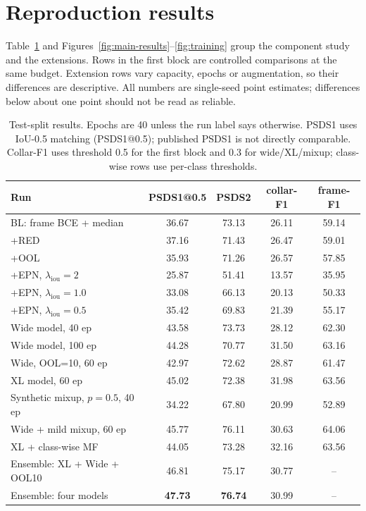 \section{Reproduction results}

Table~\ref{tab:results} and Figures~\ref{fig:main-results}--\ref{fig:training}
group the component study and the extensions. Rows in
the first block are controlled comparisons at the same budget. Extension rows
vary capacity, epochs or augmentation, so their differences are descriptive.
All numbers are single-seed point estimates; differences below about one point
should not be read as reliable.

\begin{table}[!ht]
\centering
\caption{Test-split results. Epochs are 40 unless the run label says otherwise. PSDS1 uses IoU-0.5 matching (PSDS1@0.5); published PSDS1 is not directly comparable. Collar-F1 uses threshold 0.5 for the first block and 0.3 for wide/XL/mixup; class-wise rows use per-class thresholds.}
\label{tab:results}
\begin{tabular}{lcccc}
\toprule
Run & PSDS1@0.5 & PSDS2 & collar-F1 & frame-F1 \\
\midrule
BL: frame BCE + median & 36.67 & 73.13 & 26.11 & 59.14 \\
+RED & 37.16 & 71.43 & 26.47 & 59.01 \\
+OOL & 35.93 & 71.26 & 26.57 & 57.85 \\
+EPN, $\lambda_{\mathrm{iou}}=2$ & 25.87 & 51.41 & 13.57 & 35.95 \\
+EPN, $\lambda_{\mathrm{iou}}=1.0$ & 33.08 & 66.13 & 20.13 & 50.33 \\
+EPN, $\lambda_{\mathrm{iou}}=0.5$ & 35.42 & 69.83 & 21.39 & 55.17 \\
Wide model, 40 ep & 43.58 & 73.73 & 28.12 & 62.30 \\
Wide model, 100 ep & 44.28 & 70.77 & 31.50 & 63.16 \\
Wide, OOL=10, 60 ep & 42.97 & 72.62 & 28.87 & 61.47 \\
XL model, 60 ep & 45.02 & 72.38 & 31.98 & 63.56 \\
Synthetic mixup, $p=0.5$, 40 ep & 34.22 & 67.80 & 20.99 & 52.89 \\
Wide + mild mixup, 60 ep & 45.77 & 76.11 & 30.63 & 64.06 \\
XL + class-wise MF & 44.05 & 73.28 & 32.16 & 63.56 \\
Ensemble: XL + Wide + OOL10 & 46.81 & 75.17 & 30.77 & -- \\
Ensemble: four models & \textbf{47.73} & \textbf{76.74} & 30.99 & -- \\
\bottomrule
\end{tabular}
\end{table}


